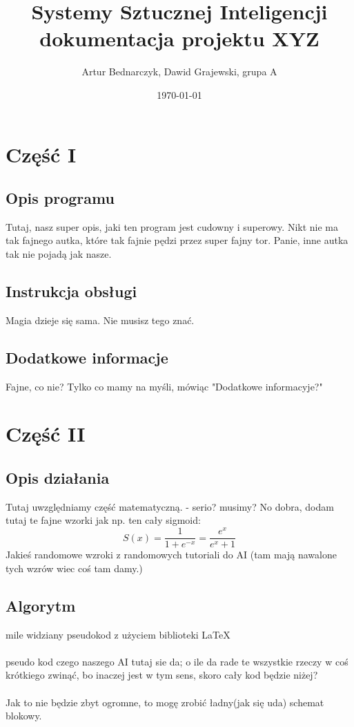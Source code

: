 \documentclass[12pt,a4paper]{article}
\begin{document}
	
	\title{Systemy Sztucznej Inteligencji\\\small{dokumentacja projektu XYZ}}
	\author{Artur Bednarczyk, Dawid Grajewski, grupa A}
	\date{\today}

	\maketitle
	\newpage
	\section*{Część I}
	\subsection*{Opis programu}
	Tutaj, nasz super opis, jaki ten program jest cudowny i superowy. Nikt nie ma tak fajnego autka, które tak fajnie pędzi przez super fajny tor.
	Panie, inne autka tak nie pojadą jak nasze.
	\subsection*{Instrukcja obsługi}
	Magia dzieje się sama. Nie musisz tego znać.
	\subsection*{Dodatkowe informacje}
	Fajne, co nie? Tylko co mamy na myśli, mówiąc "Dodatkowe informacyje?"
	\newpage
	\section*{Część II}
	\subsection*{Opis działania} 
	Tutaj uwzględniamy część matematyczną.
	- serio? musimy?
	No dobra, dodam tutaj te fajne wzorki jak np. ten cały sigmoid:
	$$ S(x) = \frac{1}{1+e^{-x}} = \frac{e^x}{e^x+1} $$
	Jakieś randomowe wzroki z randomowych tutoriali do AI (tam mają nawalone tych wzrów wiec coś tam damy.)
	\subsection*{Algorytm}
	mile widziany pseudokod z użyciem biblioteki \LaTeX
	\\
	\\
	pseudo kod czego naszego AI tutaj sie da; o ile da rade te wszystkie rzeczy w coś krótkiego zwinąć, bo inaczej jest w tym sens, skoro cały kod będzie niżej?\\
	\\
	Jak to nie będzie zbyt ogromne, to mogę zrobić ładny(jak się uda) schemat blokowy.
\end{document}
